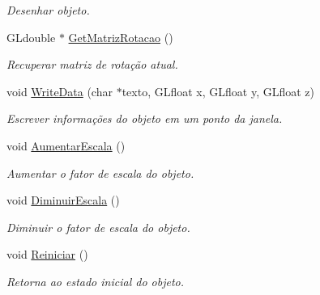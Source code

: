 \begin{DoxyCompactItemize}
\begin{DoxyCompactList}\small\item\em Desenhar objeto. \end{DoxyCompactList}\item 
G\+Ldouble $\ast$ \hyperlink{class_objeto3d_a1dff3d3ddcede978fce9e961c13b96d8}{Get\+Matriz\+Rotacao} ()
\begin{DoxyCompactList}\small\item\em Recuperar matriz de rotação atual. \end{DoxyCompactList}\item 
void \hyperlink{class_objeto3d_a95dbd1c265ace9c4596c4c96552f28e1}{Write\+Data} (char $\ast$texto, G\+Lfloat x, G\+Lfloat y, G\+Lfloat z)
\begin{DoxyCompactList}\small\item\em Escrever informações do objeto em um ponto da janela. \end{DoxyCompactList}\item 
\hypertarget{class_objeto3d_a97c8c05fd5f78c4c380e5b1e78fbd3f2}{void \hyperlink{class_objeto3d_a97c8c05fd5f78c4c380e5b1e78fbd3f2}{Aumentar\+Escala} ()}\label{class_objeto3d_a97c8c05fd5f78c4c380e5b1e78fbd3f2}

\begin{DoxyCompactList}\small\item\em Aumentar o fator de escala do objeto. \end{DoxyCompactList}\item 
\hypertarget{class_objeto3d_a33bae92d118504201e21e048355324a0}{void \hyperlink{class_objeto3d_a33bae92d118504201e21e048355324a0}{Diminuir\+Escala} ()}\label{class_objeto3d_a33bae92d118504201e21e048355324a0}

\begin{DoxyCompactList}\small\item\em Diminuir o fator de escala do objeto. \end{DoxyCompactList}\item 
\hypertarget{class_objeto3d_a90e294cabec1bfb7b30fa3748560bf25}{void \hyperlink{class_objeto3d_a90e294cabec1bfb7b30fa3748560bf25}{Reiniciar} ()}\label{class_objeto3d_a90e294cabec1bfb7b30fa3748560bf25}

\begin{DoxyCompactList}\small\item\em Retorna ao estado inicial do objeto. \end{DoxyCompactList}\end{DoxyCompactItemize}


